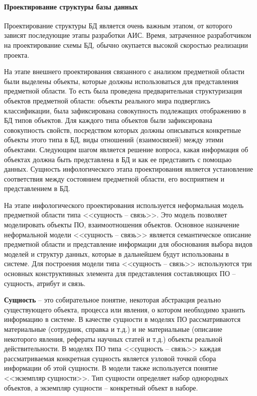 \paragraph{Проектирование структуры базы данных} \hfill

Проектирование структуры БД является очень важным этапом, от которого зависят последующие этапы разработки АИС. Время, затраченное разработчиком на проектирование схемы БД, обычно окупается высокой скоростью реализации проекта.

На этапе внешнего проектирования связанного с анализом предметной области были выделены объекты, которые должны использоваться для представления предметной области. То есть была проведена предварительная структуризация объектов предметной области: объекты реального мира подверглись классификации, была зафиксирована совокупность подлежащих отображению в БД типов объектов. Для каждого типа объектов были зафиксирована совокупность свойств, посредством которых должны описываться конкретные объекты этого типа в БД, виды отношений (взаимосвязей) между этими объектами. Следующим шагом является решение вопроса, какая информация об объектах должна быть представлена в БД и как ее представить с помощью данных. Сущность инфологического этапа проектирования является установление соответствия между состоянием предметной области, его восприятием и представлением в БД.

На этапе инфологического проектирования используется неформальная модель предметной области типа <<сущность -- связь>>. Это модель позволяет моделировать объекты ПО, взаимоотношения объектов. Основное назначение неформальной модели <<сущность -- связь>> является семантическое описание предметной области и представление информации для обоснования выбора видов моделей и структур данных, которые в дальнейшем будут использованы в системе. Для построения модели типа <<сущность -- связь>> используются три основных конструктивных элемента для представления составляющих ПО – сущность, атрибут и связь.

\textbf{Сущность} -- это собирательное понятие, некоторая абстракция реально существующего объекта, процесса или явления, о котором необходимо хранить информацию в системе. В качестве сущности в моделях ПО рассматриваются материальные (сотрудник, справка и т.д.) и не материальные (описание некоторого явления, рефераты научных статей и т.д.) объекты реальной действительности. В моделях ПО типа <<сущность -- связь>> каждая рассматриваемая конкретная сущность является узловой точкой сбора информации об этой сущности. В модели также используется понятие <<экземпляр сущности>>. Тип сущности определяет набор однородных объектов, а экземпляр сущности -- конкретный объект в наборе.

